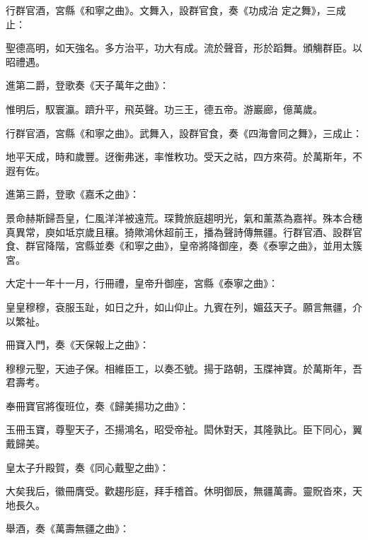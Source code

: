 \begin{pinyinscope}
 行群官酒，宮縣《和寧之曲》。文舞入，設群官食，奏《功成治
 定之舞》，三成止：



 聖德高明，如天強名。多方治平，功大有成。流於聲音，形於蹈舞。頒觴群臣。以昭禮遇。



 進第二爵，登歌奏《天子萬年之曲》：



 惟明后，馭寰瀛。躋升平，飛英聲。功三王，德五帝。游巖廊，億萬歲。



 行群官酒，宮縣《和寧之曲》。武舞入，設群官食，奏《四海會同之舞》，三成止：



 地平天成，時和歲豐。迓衡弗迷，率惟敉功。受天之祜，四方來荷。於萬斯年，不遐有佐。



 進第三爵，登歌《嘉禾之曲》：



 景命赫斯歸吾皇，仁風洋洋被遠荒。琛贄旅庭趨明光，氣和薰蒸為嘉祥。殊本合穗真異常，庾如坻京歲且穰。猗歟鴻休超前王，播為聲詩傳無疆。行群官酒、設群官食、群官降階，宮縣並奏《和寧之曲》，皇帝將降御座，奏《泰寧之曲》，並用太簇宮。



 大定十一年十一月，行冊禮，皇帝升御座，宮縣《泰寧之曲》：



 皇皇穆穆，袞服玉趾，如日之升，如山仰止。九賓在列，媚茲天子。願言無疆，介以繁祉。



 冊寶入門，奏《天保報上之曲》：



 穆穆元聖，天迪子保。相維臣工，以奏丕號。揚于路朝，玉牒神寶。於萬斯年，吾君壽考。



 奉冊寶官將復班位，奏《歸美揚功之曲》：



 玉冊玉寶，尊聖天子，丕揚鴻名，昭受帝祉。閎休對天，其隆孰比。臣下同心，翼戴歸美。



 皇太子升殿賀，奏《同心戴聖之曲》：



 大矣我后，徽冊膺受。歡趨彤庭，拜手稽首。休明御辰，無疆萬壽。靈貺沓來，天地長久。



 舉酒，奏《萬壽無疆之曲》：




\end{pinyinscope}
